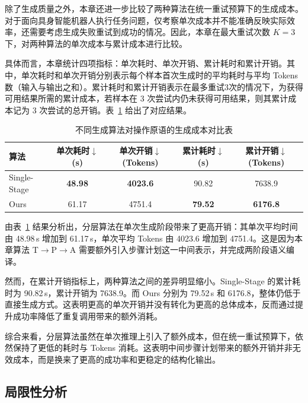 除了生成质量之外，本章还进一步比较了两种算法在统一重试预算下的生成成本。对于面向具身智能机器人执行任务问题，仅考察单次成本并不能准确反映实际效率，还需要考虑生成失败重试到成功的情况。因此，本章在最大重试次数 $K=3$ 下，对两种算法的单次成本与累计成本进行比较。

具体而言，本章统计四项指标：单次耗时、单次开销、累计耗时和累计开销。其中，单次耗时和单次开销分别表示每个样本首次生成时的平均耗时与平均 Tokens 数（输入与输出之和）。累计耗时和累计开销表示在最多重试3次的情况下，为获得可用结果所需的累计成本，若样本在 3 次尝试内仍未获得可用结果，则其累计成本记为 3 次尝试的总开销。表~\ref{tab:ch5_efficiency_cost} 给出了对应结果。

\begin{table}[htbp]
\centering
\caption{不同生成算法对操作原语的生成成本对比表}
\label{tab:ch5_efficiency_cost}
\small
\setlength{\tabcolsep}{8pt}
\begin{tabular}{lcccc}
\toprule
算法 & 单次耗时$\downarrow$(s)  & 单次开销$\downarrow$(Tokens) & 累计耗时$\downarrow$(s)& 累计开销$\downarrow$(Tokens)  \\
\midrule
Single-Stage & \textbf{48.98} & \textbf{4023.6} & 90.82 & 7638.9 \\
Ours & 61.17 & 4751.4 & \textbf{79.52} & \textbf{6176.8} \\
\bottomrule
\end{tabular}
\end{table}

由表~\ref{tab:ch5_efficiency_cost} 结果分析出，分层算法在单次生成阶段带来了更高开销：其单次平均时间由 48.98\,s 增加到 61.17\,s，单次平均 Tokens 由 4023.6 增加到 4751.4。这是因为本章算法 T$\rightarrow$P$\rightarrow$A 需要额外引入步骤计划这一中间表示，并完成两阶段语义编译。

然而，在累计开销指标上，两种算法之间的差异明显缩小。Single-Stage 的累计耗时为 90.82\,s，累计开销为 7638.9。而 Ours 分别为 79.52\,s 和 6176.8，整体仍低于直接生成方式。这表明更高的单次开销并没有转化为更高的总体成本，反而通过提升成功率降低了重复调用带来的额外消耗。

综合来看，分层算法虽然在单次推理上引入了额外成本，但在统一重试预算下，依然保持了更低的耗时与 Tokens 消耗。这表明中间步骤计划带来的额外开销并非无效成本，而是换来了更高的成功率和更稳定的结构化输出。


\subsection{局限性分析}

